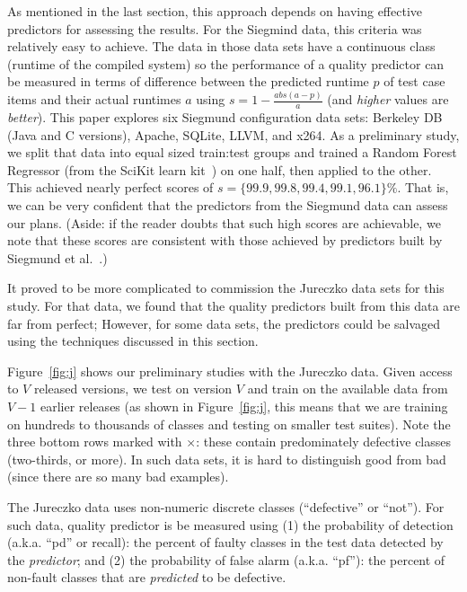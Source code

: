 \documentclass{sig-alternate}
\newcommand{\fig}[1]{Figure~\ref{fig:#1}}
\begin{document}
  As mentioned in the last section,  this approach depends on having effective predictors for assessing the results.
  For the Siegmind data, this criteria was   relatively easy to achieve.
  The data in those data sets have a continuous class (runtime of the compiled system)
  so the performance of a quality predictor can  be measured in terms of  difference between the predicted runtime $p$ of test case items and their actual runtimes $a$ using  $s= 1 - \frac{abs(a - p)}{a}$ (and {\em higher} values are {\em better}).
This paper  explores six Siegmund configuration data sets:  Berkeley DB (Java and C versions), Apache, SQLite, LLVM, and
  x264. 
  As a preliminary study, we split that data   into equal sized train:test groups
  and trained a Random Forest
  Regressor (from the SciKit learn kit~\cite{Pedregosa2012})   on one half, then applied to the other. This  achieved nearly perfect scores of $s=\{99.9, 99.8, 99.4, 99.1, 96.1\}\%$.
That is, we can be very confident that the predictors from the Siegmund data can assess
our plans. (Aside: if the reader doubts that such high scores are achievable, we note that these scores are consistent with those achieved by predictors built by Siegmund et al.~\cite{sven12}.)



 It proved to be  more complicated to commission the Jureczko data sets for this study.
 For that data, we found that the
 quality predictors built from this data are far from perfect;
However, for some data sets, the  predictors could
be salvaged using the techniques discussed in this section.

 \fig{j} shows our preliminary studies with the Jureczko   data.
Given access to $V$ released
versions, we test on version $V$ and train on the available data from $V-1$ earlier releases (as
shown in \fig{j}, this means that we are training on hundreds to thousands
of classes and testing on smaller test suites).
Note the   \colorbox{lavenderpink}{three bottom rows}   marked with $\times$: these contain predominately defective classes (two-thirds, or more).  In such data sets, it is hard to distinguish good from bad (since there are so many bad examples). 


The  Jureczko data uses non-numeric discrete classes (``defective'' or ``not'').
For such data, quality predictor   is be measured using
(1) the  probability of detection (a.k.a. ``pd'' or recall):  the percent of faulty classes in
the test data detected
by the {\em predictor}; and (2) the 
probability of false alarm (a.k.a. ``pf''): the percent of non-fault
classes that are {\em predicted} to be defective.
\end{document}
